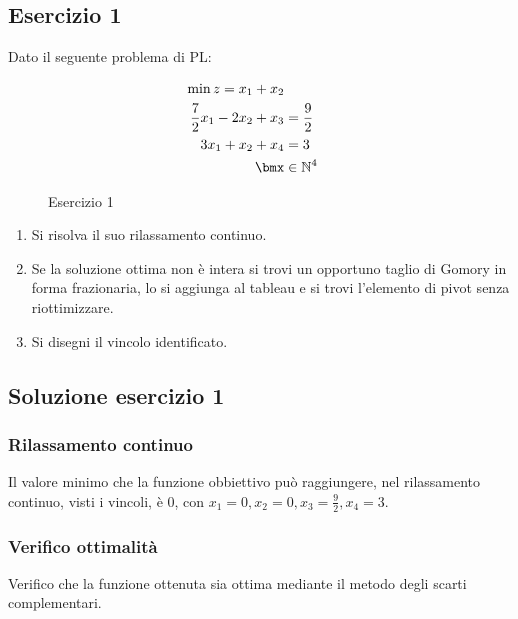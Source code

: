 \documentclass[\main/main.tex]{subfiles}
\begin{document}
\subsection{Esercizio 1}
Dato il seguente problema di PL:

\begin{figure}
  \begin{align*}
    \min z = x_1 + x_2                             \\
    \frac{7}{2}x_1 - 2x_2 + x_3 & = \frac{9}{2}    \\
    3x_1 + x_2 + x_4            & = 3              \\
    \bmx                        & \in \mathbb{N}^4
  \end{align*}
  \caption{Esercizio 1}
\end{figure}

\begin{enumerate}
  \item Si risolva il suo rilassamento continuo.
  \item Se la soluzione ottima non è intera si trovi un opportuno taglio di Gomory in forma frazionaria, lo si aggiunga al tableau e si trovi l'elemento di pivot senza riottimizzare.
  \item Si disegni il vincolo identificato.
\end{enumerate}

\subsection{Soluzione esercizio 1}
\subsubsection*{Rilassamento continuo}
Il valore minimo che la funzione obbiettivo può raggiungere, nel rilassamento continuo, visti i vincoli, è $0$, con $x_1 = 0, x_2 = 0, x_3 = \frac{9}{2}, x_4 = 3$.

\subsubsection*{Verifico ottimalità}
Verifico che la funzione ottenuta sia ottima mediante il metodo degli scarti complementari.
\end{document}
